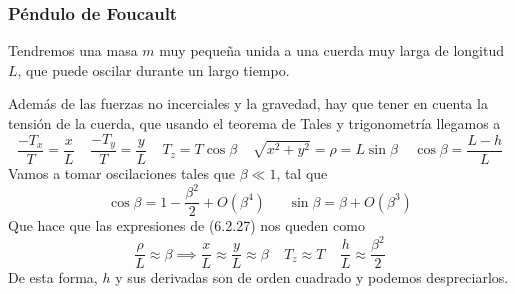 \subsubsection{Péndulo de Foucault}
\begin{marginfigure}[0pt]
    \def\svgwidth{3.5 cm}
    \normalsize
	
    \vspace{-10pt}
\end{marginfigure}

\begin{marginfigure}[0pt]
    \def\svgwidth{3.5 cm}
    \normalsize
	
    \vspace{-10pt}
\end{marginfigure}

Tendremos una masa $m$ muy pequeña unida a una cuerda muy larga de longitud $L$, que puede oscilar durante un largo tiempo.

Además de las fuerzas no incerciales y la gravedad, hay que tener en cuenta la tensión de la cuerda, que usando el teorema de Tales y trigonometría llegamos a
\begin{equation} \label{6.1.1}
    \frac{-T_x}{T} = \frac{x}{L} \ \ \ \ \ \frac{-T_y}{T} = \frac{y}{L} \ \ \ \ \ T_z = T \cos \beta \ \ \ \ \ \sqrt{x^2 +y^2} =\rho = L \sin \beta \ \ \ \ \  \cos\beta = \frac{L-h}{L}
\end{equation} 
Vamos a tomar oscilaciones tales que $\beta \ll 1$, tal que
\begin{equation} \label{6.1.1}
    \cos\beta = 1 -\frac{\beta^2}{2} + O(\beta^4) \ \ \ \ \ \ \ \sin \beta = \beta + O(\beta^3)
\end{equation} 
Que hace que las expresiones de (6.2.27) nos queden como
\begin{equation} \label{6.1.1}
    \frac{\rho}{L} \approx \beta \implies \frac{x}{L} \approx \frac{y}{L} \approx \beta \ \ \ \ \ T_z \approx T \ \ \ \ \  \frac{h}{L} \approx \frac{\beta^2}{2}
\end{equation} 
De esta forma, $h$ y sus derivadas son de orden cuadrado y podemos despreciarlos.


